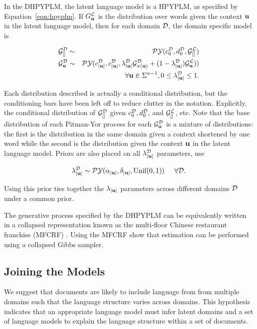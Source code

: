 In the DHPYPLM, the latent language model is a HPYPLM, as specified by Equation~\ref{eqn:hpyplm}.  If $G^\LA_\bu$ is the distribution over words given the context $\bu$ in the latent language model, then for each domain $\D$,  the domain specific model is

\begin{eqnarray}
\G^\D_{[]} &\sim& \PY(c^\D_0, d^\D_0,\G^\LA_{[]}) \nonumber \\
\G^\D_\bu &\sim& \PY(c^\D_{|\bu|}, c^\D_{|\bu|}, \lambda^\D_{|\bu|}\G^\D_{\pi(\bu)} + (1-\lambda^\D_{|\bu|})\G^\LA_\bu)) \nonumber \\ 
&& \hspace{2cm} \forall \bu \in \Sigma^{n-1}, 0 \leq \lambda^\D_{|\bu|} \leq 1. \nonumber
\end{eqnarray}

Each distribution described is actually a conditional distribution, but the conditioning bars have been left off to reduce clutter in the notation.  Explicitly, the conditional distribution of $\G^\D_{[]}$ given $c^\D_0, d^\D_0,$ and $\G^\LA_{[]}$, etc.  Note that the base distribution of each Pitman-Yor process for each $\G^\D_\bu$ is a mixture of distributions: the first is the distribution in the same domain given a context shortened by one word while the second is the distribution given the context $\bu$ in the latent language model. Priors are also placed on all $\lambda^\D_{|\bu|}$ parameters, \cite{wood and teh} use

$$\lambda^\D_{|\bu|} \sim \PY(\alpha_{|\bu|}, \delta_{|\bu|}, \textrm{Unif}(0,1))  \hspace{.5cm} \forall \D.$$

Using this prior ties together the $\lambda_{|\bu|}$ parameters across different domains $\D$ under a common prior.

The generative process specified by the  DHPYPLM can be equivalently written in a collapsed representation known as the multi-floor Chinese restaurant franchise (MFCRF) \cite{wood and teh}.  Using the MFCRF \cite{wood and teh} show that estimation can be performed using a collapsed Gibbs sampler.

\subsection{Joining the Models}

We suggest that documents are likely to include language from from multiple domains such that the language structure varies across domains. This hypothesis indicates that an appropriate language model must infer latent domains and a set of language models to explain the language structure within a set of documents.

